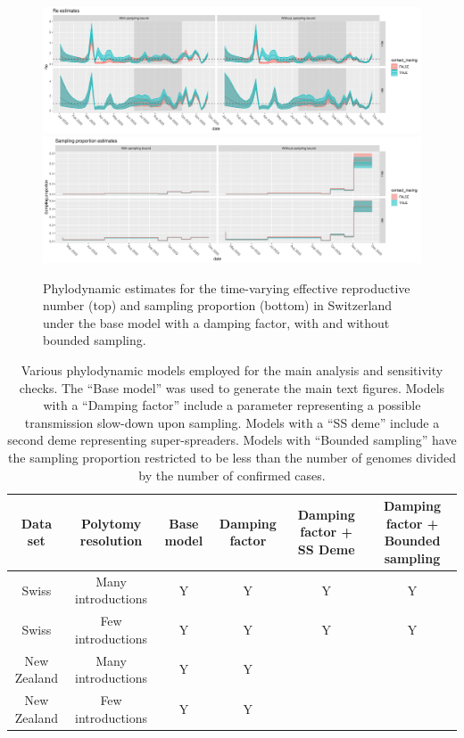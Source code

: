 \documentclass[9pt,twoside,lineno]{pnas-new}
\begin{document}
\begin{figure}[tbhp]
\centering
\includegraphics[width=\linewidth]{figures/bdsky_2021-08-18/Re_CHE_1deme.pdf}
\vfill
\includegraphics[width = \linewidth]{figures/bdsky_2021-08-18/sampProp_CHE_1deme.pdf}
\caption{Phylodynamic estimates for the time-varying effective reproductive number (top) and sampling proportion (bottom) in Switzerland under the base model with a damping factor, with and without bounded sampling.}  
\label{fig:1DemeCHResults}
\end{figure}

\newpage
\begin{table}
\caption{Various phylodynamic models employed for the main analysis and sensitivity checks. The ``Base model'' was used to generate the main text figures. Models with a ``Damping factor'' include a parameter representing a possible transmission slow-down upon sampling. Models with a ``SS deme'' include a second deme representing super-spreaders. Models with ``Bounded sampling'' have the sampling proportion restricted to be less than the number of genomes divided by the number of confirmed cases.}
\label{tab:phylo-models}
\begin{tabular}{cccccc}
Data set & Polytomy resolution & Base model & Damping factor & Damping factor + SS Deme & Damping factor + Bounded sampling \\
\midrule
Swiss & Many introductions & Y & Y & Y & Y \\
Swiss & Few introductions & Y & Y & Y & Y \\
New Zealand & Many introductions & Y & Y & & \\
New Zealand & Few introductions & Y & Y & & \\
\bottomrule
\end{tabular}
\end{table}
\end{document}
